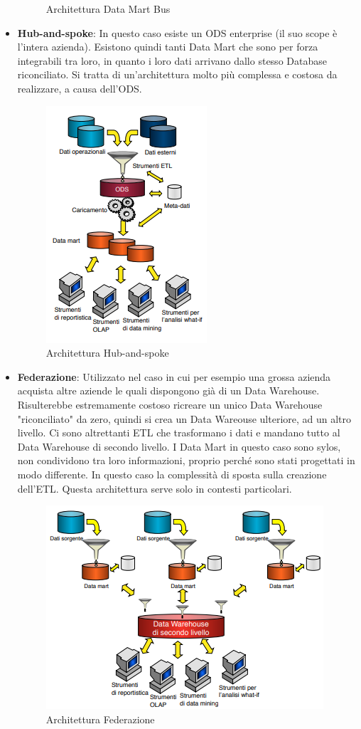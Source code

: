 \begin{itemize}
\begin{figure}[H]
\begin{center}
			\caption{Architettura Data Mart Bus}
		\end{center}
	\end{figure}
	\item \textbf{Hub-and-spoke}: In questo caso esiste un ODS enterprise (il suo scope è l'intera azienda). Esistono quindi tanti Data Mart che sono per forza integrabili tra loro, in quanto i loro dati arrivano dallo stesso Database riconciliato. Si tratta di un'architettura molto più complessa e costosa da realizzare, a causa dell'ODS.
	\begin{figure}[H]
		\begin{center}
			\includegraphics[width=0.35\linewidth]{img/hubspoke.PNG}
			\caption{Architettura Hub-and-spoke}
		\end{center}
	\end{figure}
	\item \textbf{Federazione}: Utilizzato nel caso in cui per esempio una grossa azienda acquista altre aziende le quali dispongono già di un Data Warehouse. Risulterebbe estremamente costoso ricreare un unico Data Warehouse "riconciliato" da zero, quindi si crea un Data Wareouse ulteriore, ad un altro livello. Ci sono altrettanti ETL che trasformano i dati e mandano tutto al Data Warehouse di secondo livello.\newline
	I Data Mart in questo caso sono sylos, non condividono tra loro informazioni, proprio perché sono stati progettati in modo differente.\newline
	In questo caso la complessità di sposta sulla creazione dell'ETL.\newline
	Questa architettura serve solo in contesti particolari.
	\begin{figure}[H]
		\begin{center}
			\includegraphics[width=0.5\linewidth]{img/federation.PNG}
			\caption{Architettura Federazione}
		\end{center}
	\end{figure}
\end{itemize}

